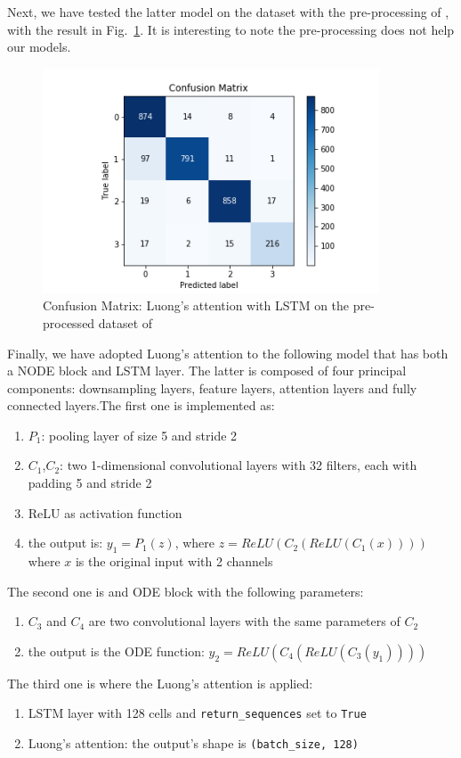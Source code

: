 \documentclass[LaM,binding=0.6cm]{sapthesis}
\begin{document}
Next, we have tested the latter model on the dataset with the pre-processing of \cite{cnnfazeli}, with the result in Fig.~\ref{fig:lstmatcnn}. It is interesting to note the pre-processing does not help our models.
\begin{figure}  \centering
    \includegraphics[width=100mm,scale=0.7]{lstmatcnn}
    \caption{Confusion Matrix: Luong's attention with LSTM on the pre-processed dataset of \cite{cnnfazeli}}
    \label{fig:lstmatcnn}
\end{figure}
Finally, we have adopted Luong's attention to the following model that has both a NODE block and LSTM layer. The latter is composed of four principal components: downsampling layers, feature layers, attention layers and fully connected layers.The first one is implemented as:
\begin{enumerate}
\item $P_1$: pooling layer of size 5 and stride 2
\item $C_1$,$C_2$: two 1-dimensional convolutional layers with 32 filters, each with padding 5 and stride 2
\item ReLU as activation function
\item the output is: $y_1=P_1(z)$, where $z=ReLU(C_2(ReLU(C_1(x))))$ where $x$ is the original input with 2 channels
\end{enumerate}
The second one is and ODE block with the following parameters:
\begin{enumerate}
\item $C_3$ and $C_4$ are two convolutional layers with the same parameters of $C_2$
\item the output is the ODE function: $y_2=ReLU(C_4(ReLU(C_3(y_1))))$
\end{enumerate}
The third one is where the Luong's attention is applied:
\begin{enumerate}
\item LSTM layer with 128 cells and \texttt{return\_sequences} set to \texttt{True}
\item Luong's attention: the output's shape is \texttt{(batch\_size, 128)} 
\end{enumerate}
\end{document}
